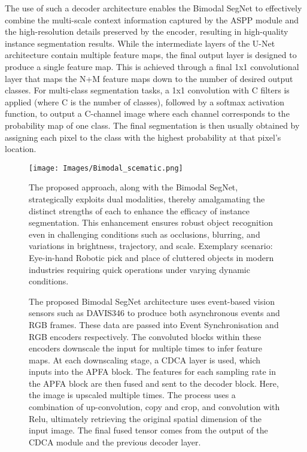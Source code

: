 \documentclass[lettersize,journal]{IEEEtran}
\begin{document}
The use of such a decoder architecture enables the Bimodal SegNet to effectively combine the multi-scale context information captured by the ASPP module and the high-resolution details preserved by the encoder, resulting in high-quality instance segmentation results. While the intermediate layers of the U-Net architecture contain multiple feature maps, the final output layer is designed to produce a single feature map. This is achieved through a final 1x1 convolutional layer that maps the N+M feature maps down to the number of desired output classes. For multi-class segmentation tasks, a 1x1 convolution with C filters is applied (where C is the number of classes), followed by a softmax activation function, to output a C-channel image where each channel corresponds to the probability map of one class. The final segmentation is then usually obtained by assigning each pixel to the class with the highest probability at that pixel's location.

\begin{figure}[h!]
      \centering
\texttt{[image: Images/Bimodal\_scematic.png]}
\caption{The proposed approach, along with the Bimodal SegNet, strategically exploits dual modalities, thereby amalgamating the distinct strengths of each to enhance the efficacy of instance segmentation. This enhancement ensures robust object recognition even in challenging conditions such as occlusions, blurring, and variations in brightness, trajectory, and scale. Exemplary scenario: Eye-in-hand Robotic pick and place of cluttered objects in modern industries requiring quick operations under varying dynamic conditions.}
\label{fig: Overview BimodalNet with arm}
\end{figure}



\begin{figure*}[h!]
\caption{\footnotesize
{ The proposed Bimodal SegNet architecture uses event-based vision sensors such as DAVIS346 to produce both asynchronous events and RGB frames. These data are passed into Event Synchronisation and RGB encoders respectively. The convoluted blocks within these encoders downscale the input for multiple times to infer feature maps. At each downscaling stage, a CDCA layer is used, which inputs into the APFA block. The features for each sampling rate in the APFA block are then fused and sent to the decoder block. Here, the image is upscaled multiple times. The process uses a combination of up-convolution, copy and crop, and convolution with Relu, ultimately retrieving the original spatial dimension of the input image. The final fused tensor comes from the output of the CDCA module and the previous decoder layer. } }
\label{fig:BimodalNet}
\end{figure*}
\end{document}
